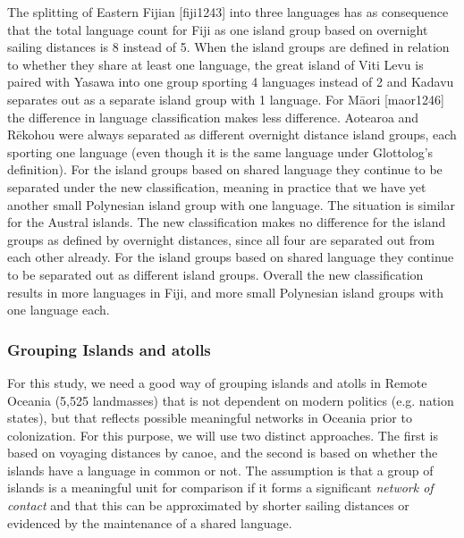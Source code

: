 \documentclass[12pt,letterpaper]{article}
\begin{document}
The splitting of Eastern Fijian [fiji1243] into three languages has as consequence that the total language count for Fiji as one island group based on overnight sailing distances is 8 instead of 5. When the island groups are defined in relation to whether they share at least one language, the great island of Viti Levu is paired with Yasawa into one group sporting 4 languages instead of 2 and Kadavu separates out as a separate island group with 1 language. For M\={a}ori [maor1246] the difference in language classification makes less difference. Aotearoa and  R\={e}kohou were always separated as different overnight distance island groups, each sporting one language (even though it is the same language under Glottolog's definition). For the island groups based on shared language they continue to be separated under the new classification, meaning in practice that we have yet another small Polynesian island group with one language. The situation is similar for the Austral islands. The new classification makes no difference for the island groups as defined by overnight distances, since all four are separated out from each other already. For the island groups based on shared language they continue to be separated out as different island groups. Overall the new classification results in more languages in Fiji, and more small Polynesian island groups with one language each.


\FloatBarrier
\subsubsection{Grouping Islands and atolls}
\label{sec:island_geo}


For this study, we need a good way of grouping islands and atolls in Remote Oceania (5,525 landmasses) that is not dependent on modern politics (e.g. nation states), but that reflects possible meaningful networks in Oceania prior to colonization. For this purpose, we will use two distinct approaches. The first is based on voyaging distances by canoe, and the second is based on whether the islands have a language in common or not. The assumption is that a group of islands is a meaningful unit for comparison if it forms a significant \textit{network of contact} and that this can be approximated by shorter sailing distances or evidenced by the maintenance of a shared language. 
\end{document}
